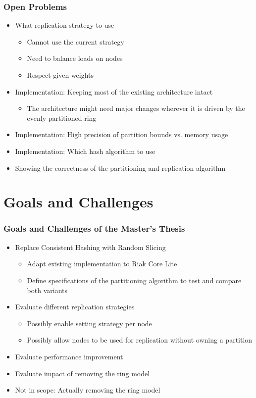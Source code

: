 \documentclass[aspectratio=169]{beamer}
\begin{document}
\begin{frame}
\frametitle{Open Problems}
\begin{itemize}
\item What replication strategy to use
\begin{itemize}
\item Cannot use the current strategy
\item Need to balance loads on nodes
\item Respect given weights
\end{itemize}
\item Implementation: Keeping most of the existing architecture intact
\begin{itemize}
\item The architecture might need major changes wherever it is driven by the evenly partitioned ring
\end{itemize}
\item Implementation: High precision of partition bounds vs. memory usage
\item Implementation: Which hash algorithm to use
\item Showing the correctness of the partitioning and replication algorithm
\end{itemize}
\end{frame}

\section{Goals and Challenges}
\begin{frame}
\frametitle{Goals and Challenges of the Master's Thesis}
\begin{itemize}
\item Replace Consistent Hashing with Random Slicing
\begin{itemize}
\item Adapt existing implementation to Riak Core Lite
\item Define specifications of the partitioning algorithm to test and compare both variants
\end{itemize}
\item Evaluate different replication strategies
\begin{itemize}
\item Possibly enable setting strategy per node
\item Possibly allow nodes to be used for replication without owning a partition
\end{itemize}
\item Evaluate performance improvement
\item Evaluate impact of removing the ring model
\item Not in scope: Actually removing the ring model
\end{itemize}
\end{frame}
\end{document}
